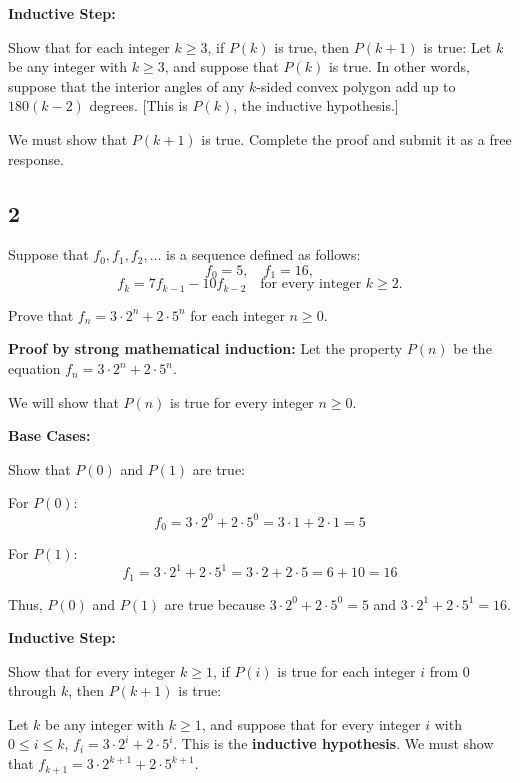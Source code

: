 \documentclass[12pt]{article}
\begin{document}
\textbf{Inductive Step:} 

Show that for each integer \( k \geq 3 \), if \( P(k) \) is true, then \( P(k + 1) \) is true: Let \( k \) be any integer with \( k \geq 3 \), and suppose that \( P(k) \) is true. In other words, suppose that the interior angles of any \( k \)-sided convex polygon add up to \( 180(k - 2) \) degrees. [This is \( P(k) \), the inductive hypothesis.]

We must show that \( P(k + 1) \) is true. Complete the proof and submit it as a free response.

\newpage

\subsection{2}

Suppose that \( f_0, f_1, f_2, \ldots \) is a sequence defined as follows:
\[
f_0 = 5, \quad f_1 = 16, 
\]
\[
f_k = 7f_{k-1} - 10f_{k-2} \quad \text{for every integer } k \geq 2.
\]

Prove that \( f_n = 3 \cdot 2^n + 2 \cdot 5^n \) for each integer \( n \geq 0 \).

\textbf{Proof by strong mathematical induction:} Let the property \( P(n) \) be the equation \( f_n = 3 \cdot 2^n + 2 \cdot 5^n \). 

We will show that \( P(n) \) is true for every integer \( n \geq 0 \).

\textbf{Base Cases:} 

Show that \( P(0) \) and \( P(1) \) are true:

For \( P(0) \):
\[
f_0 = 3 \cdot 2^0 + 2 \cdot 5^0 = 3 \cdot 1 + 2 \cdot 1 = 5
\]

For \( P(1) \):
\[
f_1 = 3 \cdot 2^1 + 2 \cdot 5^1 = 3 \cdot 2 + 2 \cdot 5 = 6 + 10 = 16
\]

Thus, \( P(0) \) and \( P(1) \) are true because \( 3 \cdot 2^0 + 2 \cdot 5^0 = 5 \) and \( 3 \cdot 2^1 + 2 \cdot 5^1 = 16 \).

\textbf{Inductive Step:} 

Show that for every integer \( k \geq 1 \), if \( P(i) \) is true for each integer \( i \) from 0 through \( k \), then \( P(k + 1) \) is true:

Let \( k \) be any integer with \( k \geq 1 \), and suppose that for every integer \( i \) with \( 0 \leq i \leq k \), \( f_i = 3 \cdot 2^i + 2 \cdot 5^i \). This is the \textbf{inductive hypothesis}. We must show that \( f_{k + 1} = 3 \cdot 2^{k+1} + 2 \cdot 5^{k+1} \).
\end{document}
